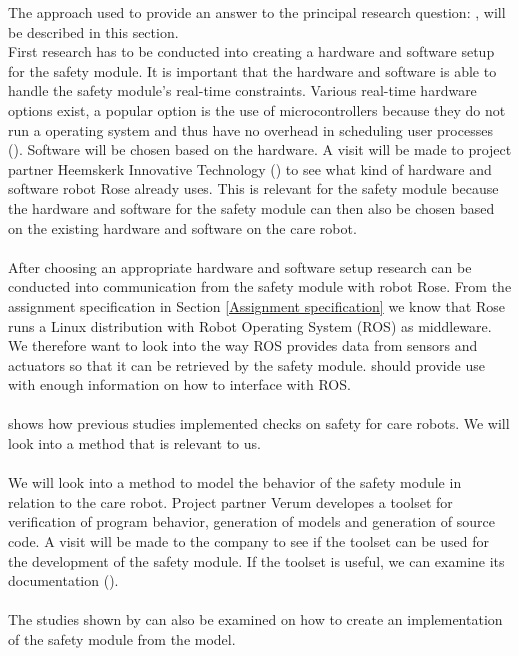 \documentclass[12pt]{scrreprt}
\begin{document}

The approach used to provide an answer to the principal research question: \textit{\mq}, will be described in this section.\\
First research has to be conducted into creating a hardware and software setup for the safety module. It is important that the hardware and software is able to handle the safety module's real-time constraints. Various real-time hardware options exist, a popular option is the use of microcontrollers because they do not run a operating system and thus have no overhead in scheduling user processes (\cite{realtime_scheduling}). Software will be chosen based on the hardware. A visit will be made to project partner Heemskerk Innovative Technology (\cite{hit}) to see what kind of hardware and software robot Rose already uses. This is relevant for the safety module because the hardware and software for the safety module can then also be chosen based on the existing hardware and software on the care robot.
\\\\
After choosing an appropriate hardware and software setup research can be conducted into communication from the safety module with robot Rose. From the assignment specification in Section \ref{Assignment specification} we know that Rose runs a Linux distribution with Robot Operating System (ROS) as middleware. We therefore want to look into the way ROS provides data from sensors and actuators so that it can be retrieved by the safety module. \cite{gentle} should provide use with enough information on how to interface with ROS.
\\\\
\cite{tadele} shows how previous studies implemented checks on safety for care robots. We will look into a method that is relevant to us.
\\\\
We will look into a method to model the behavior of the safety module in relation to the care robot. Project partner Verum developes a toolset for verification of program behavior, generation of models and generation of source code. A visit will be made to the company to see if the toolset can be used for the development of the safety module. If the toolset is useful, we can examine its documentation (\cite{verum}).
\\\\
The studies shown by \cite{tadele} can also be examined on how to create an implementation of the safety module from the model.
\end{document}
